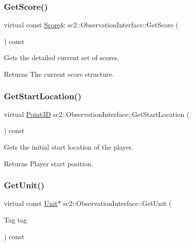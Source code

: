\subsubsection{\texorpdfstring{Get\+Score()}{GetScore()}}
{\footnotesize\ttfamily virtual const \hyperlink{structsc2_1_1_score}{Score}\& sc2\+::\+Observation\+Interface\+::\+Get\+Score (\begin{DoxyParamCaption}{ }\end{DoxyParamCaption}) const\hspace{0.3cm}{\ttfamily [pure virtual]}}

Gets the detailed current set of scores. \begin{DoxyReturn}{Returns}
The current score structure. 
\end{DoxyReturn}
\mbox{\label{classsc2_1_1_observation_interface_a67b41bf8b933702e2d83db5f7f2095f3}} 
\subsubsection{\texorpdfstring{Get\+Start\+Location()}{GetStartLocation()}}
{\footnotesize\ttfamily virtual \hyperlink{structsc2_1_1_point3_d}{Point3D} sc2\+::\+Observation\+Interface\+::\+Get\+Start\+Location (\begin{DoxyParamCaption}{ }\end{DoxyParamCaption}) const\hspace{0.3cm}{\ttfamily [pure virtual]}}

Gets the initial start location of the player. \begin{DoxyReturn}{Returns}
Player start position. 
\end{DoxyReturn}
\mbox{\label{classsc2_1_1_observation_interface_a0f766e5a6522a6966b4d2abf0a2daff2}} 
\subsubsection{\texorpdfstring{Get\+Unit()}{GetUnit()}}
{\footnotesize\ttfamily virtual const \hyperlink{classsc2_1_1_unit}{Unit}$\ast$ sc2\+::\+Observation\+Interface\+::\+Get\+Unit (\begin{DoxyParamCaption}\item[{Tag}]{tag }\end{DoxyParamCaption}) const\hspace{0.3cm}{\ttfamily [pure virtual]}}

